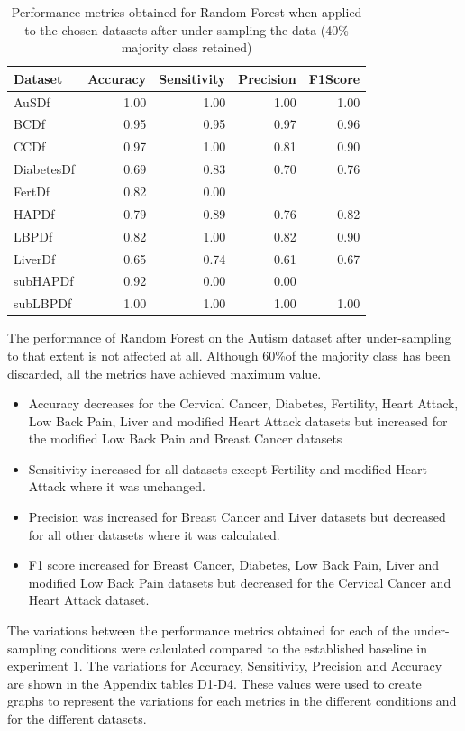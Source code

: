 \begin{table}[ht]
\centering
\begin{tabular}{lrrrr}
  \hline
  \rowcolor{LightCyan}
Dataset & Accuracy & Sensitivity & Precision & F1Score \\ 
  \hline
AuSDf & 1.00 & 1.00 & 1.00 & 1.00 \\ 
  BCDf & 0.95 & 0.95 & 0.97 & 0.96 \\ 
  CCDf & 0.97 & 1.00 & 0.81 & 0.90 \\ 
  DiabetesDf & 0.69 & 0.83 & 0.70 & 0.76 \\ 
  FertDf & 0.82 & 0.00 &  &  \\ 
  HAPDf & 0.79 & 0.89 & 0.76 & 0.82 \\ 
  LBPDf & 0.82 & 1.00 & 0.82 & 0.90 \\ 
  LiverDf & 0.65 & 0.74 & 0.61 & 0.67 \\ 
  subHAPDf & 0.92 & 0.00 & 0.00 &  \\ 
  subLBPDf & 1.00 & 1.00 & 1.00 & 1.00 \\ 
   \hline
\end{tabular}
\caption{Performance metrics obtained for Random Forest when applied to the chosen datasets after under-sampling the data (40\% majority class retained)}
\end{table}

The performance of Random Forest on the Autism dataset after under-sampling to that extent is not affected at all. Although 60\%of the majority class has been discarded, all the metrics have achieved maximum value.
\begin{itemize}
    \item Accuracy decreases for the Cervical Cancer, Diabetes, Fertility, Heart Attack, Low Back Pain, Liver and modified Heart Attack datasets but increased for the modified Low Back Pain and Breast Cancer datasets
    \item Sensitivity increased for all datasets except Fertility and modified Heart Attack where it was unchanged.
    \item Precision was increased for Breast Cancer and Liver datasets but decreased for all other datasets where it was calculated.
    \item F1 score increased for Breast Cancer, Diabetes, Low Back Pain, Liver and modified Low Back Pain datasets but decreased for the Cervical Cancer and Heart Attack dataset.
\end{itemize}

The variations between the performance metrics obtained for each of the under-sampling conditions were calculated compared to the established baseline in experiment 1.\newline
The variations for Accuracy, Sensitivity, Precision and Accuracy are shown in the Appendix tables D1-D4.
These values were used to create graphs to represent the variations for each metrics in the different conditions and for the different datasets.\newline


